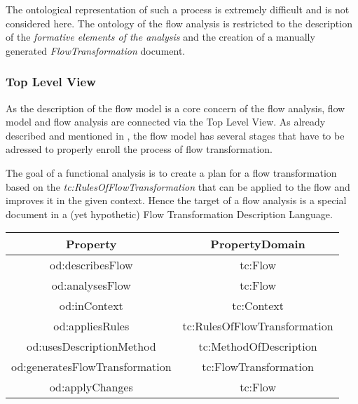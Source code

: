 \documentclass[a4paper,11pt]{article}
\begin{document}
    The ontological representation of such a process is extremely difficult and is
    not considered here. The ontology of the flow analysis is restricted to the
    description of the \emph{formative elements of the analysis} and the creation
    of a manually generated \emph{FlowTransformation} document.


    \subsubsection{Top Level View}
    As the description of the flow model is a core concern of the flow analysis,
    flow model and flow analysis are connected via the Top Level View. As already
    described and mentioned in \cite{Graebe2021}, the flow model has several stages
    that have to be adressed to properly enroll the process of flow transformation.

    The goal of a functional analysis is to create a plan for a flow
    transformation based on the \emph{tc:RulesOfFlowTransformation} that can be 
    applied to the flow and improves it in the given context. Hence the target
    of a flow analysis is a special document in a (yet hypothetic) Flow Transformation
    Description Language.

    \begin{center}
        \begin{tabular}{|c|c|}\hline
            Property & PropertyDomain \\\hline
            od:describesFlow & tc:Flow \\
            od:analysesFlow & tc:Flow \\
            od:inContext & tc:Context \\
            od:appliesRules & tc:RulesOfFlowTransformation \\
            od:usesDescriptionMethod & tc:MethodOfDescription \\
            od:generatesFlowTransformation & tc:FlowTransformation\\
            od:applyChanges & tc:Flow \\\hline 
        \end{tabular}
        \end{center}
\end{document}
